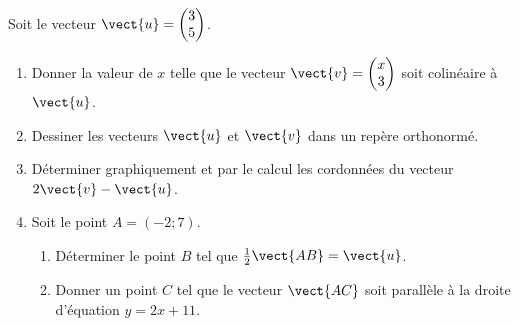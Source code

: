 
\begin{exercice}\label{exosmath-0061}

    Soit le vecteur \( \vect{ u }=\begin{pmatrix}
        3    \\ 
        5    
    \end{pmatrix}\).
    \begin{enumerate}
        \item
            Donner la valeur de \( x\) telle que le vecteur \( \vect{ v }= \begin{pmatrix}
                x    \\ 
                3    
            \end{pmatrix}\) soit colinéaire à \( \vect{ u }\).
        \item
            Dessiner les vecteurs \( \vect{ u }\) et \( \vect{ v }\) dans un repère orthonormé.
        \item
            Déterminer graphiquement et par le calcul les cordonnées du vecteur \( 2\vect{ v }-\vect{ u }\).
        \item
            Soit le point \( A=(-2;7)\). 
            \begin{enumerate}
                \item
            Déterminer le point \( B\) tel que \( \frac{ 1 }{2}\vect{ AB }=\vect{ u }\).
        \item
            Donner un point \( C\) tel que le vecteur \( \vect{ AC }\) soit parallèle à la droite d'équation \( y=2x+11\).
            \end{enumerate}
    \end{enumerate}

\end{exercice}
